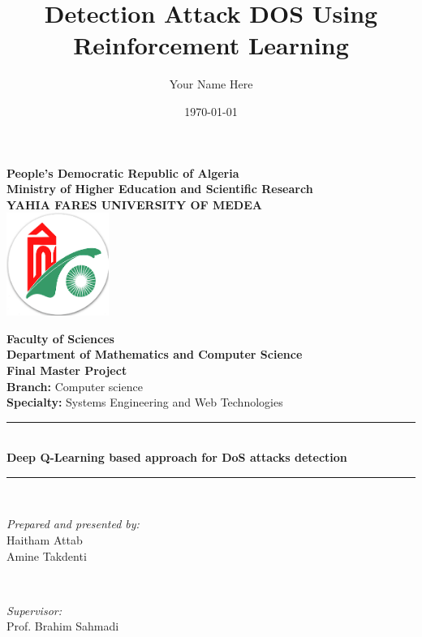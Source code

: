 \documentclass[12pt]{report}
\title{\Huge{\textbf{Detection Attack DOS Using Reinforcement Learning}}}
\author{Your Name Here}
\date{\today}
\begin{document}
\begin{center}
    \textbf{\LARGE People’s Democratic Republic of Algeria}\\[0.2cm]
    \textbf{\large Ministry of Higher Education and Scientific Research}\\[0.2cm]
    \textbf{\Large YAHIA FARES UNIVERSITY OF MEDEA}\\[1cm]

    \includegraphics[width=0.25\textwidth]{./images/univ_logo.png}\par\vspace{1.5cm}

    \textbf{\Large Faculty of Sciences}\\[0.5cm]
    \textbf{Department of Mathematics and Computer Science}\\[1cm]

    \textbf{\Huge Final Master Project}\\[1.2cm]

    \textbf{\large Branch:} Computer science\\[0.3cm]
    \textbf{\large Specialty:} Systems Engineering and Web Technologies\\[1cm]

    \rule{\linewidth}{0.5mm} \\[0.4cm]
    { \Huge \bfseries Deep Q-Learning based approach for DoS attacks detection \\[0.4cm] }
    \rule{\linewidth}{0.5mm} \\[1.5cm]

    \begin{minipage}{0.4\textwidth}
        \begin{flushleft} \large
            \emph{Prepared and presented by:}\\
            Haitham Attab \\
            Amine Takdenti
        \end{flushleft}
    \end{minipage}~
    \begin{minipage}{0.4\textwidth}
        \begin{flushright} \large
            \emph{Supervisor:}\\
            Prof. Brahim Sahmadi
        \end{flushright}
    \end{minipage}\\[2cm]
\end{center}
\end{document}

